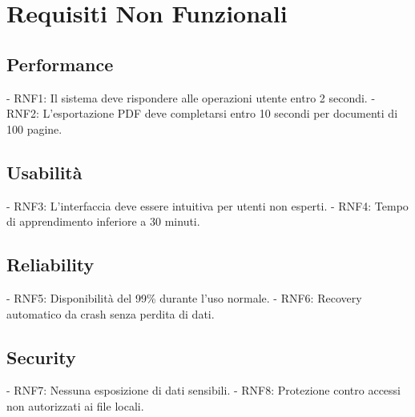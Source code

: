 \section{Requisiti Non Funzionali}

\subsection{Performance}

- RNF1: Il sistema deve rispondere alle operazioni utente entro 2 secondi.
- RNF2: L'esportazione PDF deve completarsi entro 10 secondi per documenti di 100 pagine.

\subsection{Usabilità}

- RNF3: L'interfaccia deve essere intuitiva per utenti non esperti.
- RNF4: Tempo di apprendimento inferiore a 30 minuti.

\subsection{Reliability}

- RNF5: Disponibilità del 99\% durante l'uso normale.
- RNF6: Recovery automatico da crash senza perdita di dati.

\subsection{Security}

- RNF7: Nessuna esposizione di dati sensibili.
- RNF8: Protezione contro accessi non autorizzati ai file locali.